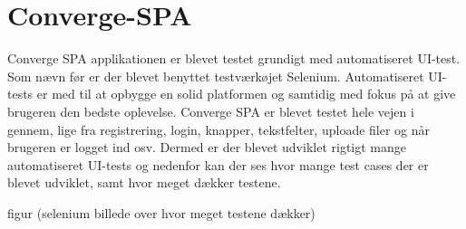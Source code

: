 \chapter{Converge-SPA}
Converge SPA applikationen er blevet testet grundigt med automatiseret UI-test. Som nævn før er der blevet benyttet testværkøjet Selenium. Automatiseret UI-tests er med til at opbygge en solid platformen og samtidig med fokus på at give brugeren den bedste oplevelse.
Converge SPA er blevet testet hele vejen i gennem, lige fra registrering, login, knapper, tekstfelter, uploade filer og når brugeren er logget ind osv. Dermed er der blevet udviklet rigtigt mange automatiseret UI-tests og nedenfor kan der ses hvor mange test cases der er blevet udviklet, samt hvor meget dækker testene. 


figur (selenium billede over hvor meget testene dækker) 
